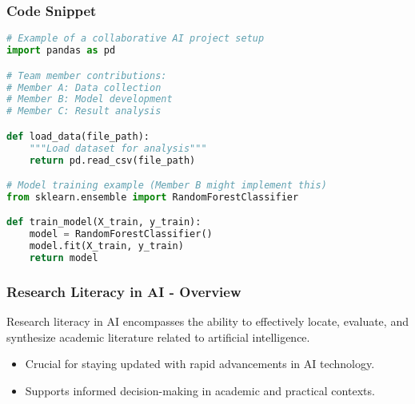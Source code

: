 \documentclass{beamer}
\begin{document}
\begin{frame}[fragile]
    \frametitle{Code Snippet}
    \begin{lstlisting}[language=python]
# Example of a collaborative AI project setup
import pandas as pd

# Team member contributions:
# Member A: Data collection
# Member B: Model development
# Member C: Result analysis

def load_data(file_path):
    """Load dataset for analysis"""
    return pd.read_csv(file_path)

# Model training example (Member B might implement this)
from sklearn.ensemble import RandomForestClassifier

def train_model(X_train, y_train):
    model = RandomForestClassifier()
    model.fit(X_train, y_train)
    return model
    \end{lstlisting}
\end{frame}

\begin{frame}[fragile]
    \frametitle{Research Literacy in AI - Overview}
    Research literacy in AI encompasses the ability to effectively locate, evaluate, and synthesize academic literature related to artificial intelligence.
    \begin{itemize}
        \item Crucial for staying updated with rapid advancements in AI technology.
        \item Supports informed decision-making in academic and practical contexts.
    \end{itemize}
\end{frame}
\end{document}

